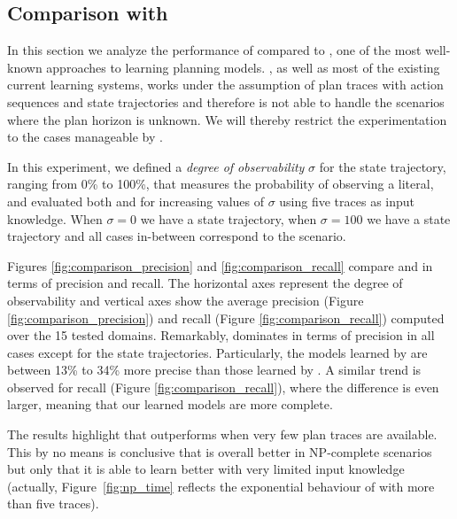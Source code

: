 \subsection{Comparison with \ARMS}

In this section we analyze the performance of \FAMA compared to \ARMS, one of the most well-known approaches to learning planning models. \ARMS, as well as most of the existing current learning systems, works under the assumption of plan traces with \FO action sequences and \NO state trajectories and therefore is not able to handle the scenarios where the plan horizon is unknown. We will thereby restrict the experimentation to the cases manageable by \ARMS.

In this experiment, we defined a \emph{degree of observability} $\sigma$ for the state trajectory, ranging from 0\% to 100\%, that measures the probability of observing a literal, and evaluated both \FAMA and \ARMS for increasing values of $\sigma$ using five traces as input knowledge. When $\sigma = 0$ we have a \NO state trajectory, when $\sigma=100$ we have a \FO state trajectory and all cases in-between correspond to the \PO scenario.

Figures \ref{fig:comparison_precision} and \ref{fig:comparison_recall} compare \FAMA and \ARMS in terms of precision and recall. The horizontal axes represent the degree of observability and vertical axes show the average precision (Figure \ref{fig:comparison_precision}) and recall (Figure \ref{fig:comparison_recall}) computed over the 15 tested domains. Remarkably, \FAMA dominates in terms of precision in all cases except for the \FO state trajectories. Particularly, the models learned by \FAMA are between 13\% to 34\% more precise than those learned by \ARMS. A similar trend is observed for recall (Figure \ref{fig:comparison_recall}), where the difference is even larger, meaning that our learned models are more complete.

The results highlight that \FAMA outperforms \ARMS when very few plan traces are available. This by no means is conclusive that \FAMA is overall better in NP-complete scenarios but only that it is able to learn better with very limited input knowledge (actually, Figure~\ref{fig:np_time} reflects the exponential behaviour of \FAMA with more than five traces).



